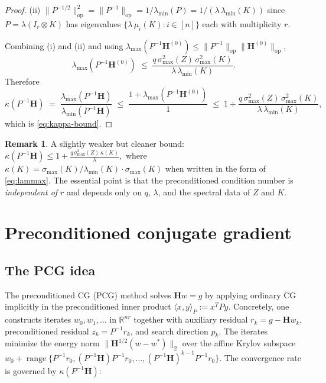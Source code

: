 \documentclass[12pt]{article}
\theoremstyle{definition}
\newtheorem{remark}[theorem]{Remark}
\newcommand{\range}{\operatorname{range}}
\newcommand{\op}{\mathrm{op}}
\newcommand{\R}{\mathbb{R}}
\begin{document}
\begin{proof}
(ii) $\|P^{-1/2}\|_\op^2=\|P^{-1}\|_\op=1/\lambda_{\min}(P)
=1/(\lambda\,\lambda_{\min}(K))$ since $P=\lambda(I_r\otimes K)$ has eigenvalues
$\{\lambda\,\mu_i(K):i\in[n]\}$ each with multiplicity $r$.

Combining (i) and (ii) and using
$\lambda_{\max}(P^{-1}\mathbf{H}^{(0)})\leq \|P^{-1}\|_\op\|\mathbf{H}^{(0)}\|_\op$,
\begin{equation}\label{eq:lammax}
\lambda_{\max}(P^{-1}\mathbf{H}^{(0)})
\;\leq\; \frac{q\,\sigma_{\max}^2(Z)\,\sigma_{\max}^2(K)}{\lambda\,\lambda_{\min}(K)}.
\end{equation}
Therefore
\[
\kappa(P^{-1}\mathbf{H})
\;=\; \frac{\lambda_{\max}(P^{-1}\mathbf{H})}{\lambda_{\min}(P^{-1}\mathbf{H})}
\;\leq\; \frac{1+\lambda_{\max}(P^{-1}\mathbf{H}^{(0)})}{1}
\;\leq\; 1+\frac{q\,\sigma_{\max}^2(Z)\,\sigma_{\max}^2(K)}{\lambda\,\lambda_{\min}(K)},
\]
which is \eqref{eq:kappa-bound}.
\end{proof}

\begin{remark}\label{rmk:simplified-kappa}
A slightly weaker but cleaner bound:
\(
\kappa(P^{-1}\mathbf{H})\leq 1+\frac{q\,\sigma_{\max}^2(Z)\,\kappa(K)}{\lambda},
\)
where $\kappa(K)=\sigma_{\max}(K)/\lambda_{\min}(K)\cdot\sigma_{\max}(K)$ when written in the
form of \eqref{eq:lammax}. The essential point is that the preconditioned condition number is
\emph{independent of $r$} and depends only on $q$, $\lambda$, and the spectral data of $Z$ and
$K$.
\end{remark}

\section{Preconditioned conjugate gradient}\label{sec:pcg}

\subsection{The PCG idea}

The preconditioned CG (PCG) method solves $\mathbf{H}w=g$ by applying ordinary CG implicitly in
the preconditioned inner product $\langle x,y\rangle_P:=x^TPy$. Concretely, one constructs
iterates $w_0,w_1,\dots$ in $\R^{nr}$ together with auxiliary residual $r_k=g-\mathbf{H}w_k$,
preconditioned residual $z_k=P^{-1}r_k$, and search direction $p_k$. The iterates minimize the
energy norm $\|\mathbf{H}^{1/2}(w-w^*)\|_2$ over the affine Krylov subspace
$w_0+\range\!\bigl\{P^{-1}r_0, (P^{-1}\mathbf{H})P^{-1}r_0,\dots,(P^{-1}\mathbf{H})^{k-1}P^{-1}r_0\bigr\}$.
The convergence rate is governed by $\kappa(P^{-1}\mathbf{H})$:
\end{document}

